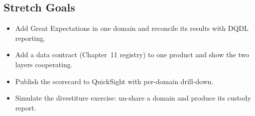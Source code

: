 \subsection*{Stretch Goals}
\begin{itemize}
    \item Add Great Expectations in one domain and reconcile its results with DQDL reporting.
    \item Add a data contract (Chapter~11 registry) to one product and show the two layers cooperating.
    \item Publish the scorecard to QuickSight with per-domain drill-down.
    \item Simulate the divestiture exercise: un-share a domain and produce its custody report.
\end{itemize}
